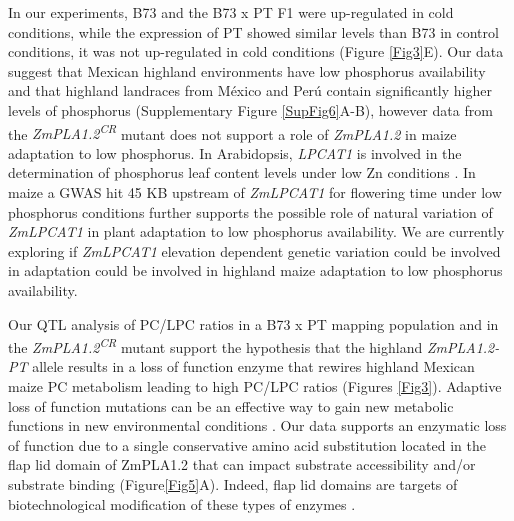 \documentclass[9pt,twocolumn,twoside,lineno]{BioRxiv}
\begin{document}
In our experiments, B73 and the B73 x PT F1 were up-regulated in cold conditions, while the expression of PT showed similar levels than B73 in control conditions, it was not up-regulated in cold conditions (Figure \ref{Fig3}E).
Our data suggest that Mexican highland environments have low phosphorus availability and that highland landraces from México and Perú contain significantly higher levels of phosphorus (Supplementary Figure \ref{SupFig6}A-B), however data from the \textit{ZmPLA1.2\textsuperscript{CR}} mutant does not support a role of \textit{ZmPLA1.2} in maize adaptation to low phosphorus.
In Arabidopsis, \textit{LPCAT1} is involved in the determination of phosphorus leaf content levels under low Zn conditions \cite{Kisko2018-zm}.
In maize a GWAS hit 45 KB upstream of \textit{ZmLPCAT1} for flowering time under low phosphorus conditions further supports the possible role of natural variation of \textit{ZmLPCAT1} in plant adaptation to low phosphorus availability. 
We are currently exploring if \textit{ZmLPCAT1} elevation dependent genetic variation could be involved in adaptation could be involved in highland maize adaptation to low phosphorus availability.

Our QTL analysis of PC/LPC ratios in a B73 x PT mapping population and in the \textit{ZmPLA1.2\textsuperscript{CR}} mutant support the hypothesis that the highland \textit{ZmPLA1.2-PT} allele results in a loss of function enzyme that rewires highland Mexican maize PC metabolism leading to high PC/LPC ratios (Figures \ref{Fig3}). 
Adaptive loss of function mutations can be an effective way to gain new metabolic functions in new environmental conditions \cite{Hottes2013-np}. 
Our data supports an enzymatic loss of function due to a single conservative amino acid substitution located in the flap lid domain of ZmPLA1.2 that can impact substrate  accessibility and/or substrate binding (Figure\ref{Fig5}A). 
Indeed, flap lid domains are targets of biotechnological modification of these types of enzymes \cite{Khan2017-ua}.
\end{document}
